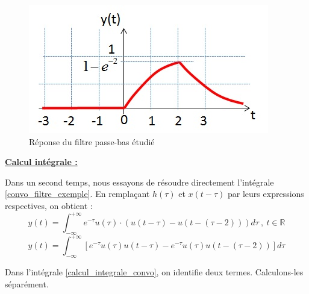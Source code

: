 	\begin{figure}[h!]
		\centering
		\includegraphics[scale=0.5]{images/Ex_reponse_prod_conv.jpg}
		\caption{Réponse du filtre passe-bas étudié}	
		\label{Fig:Ex_reponse_convo} 
	\end{figure}

	\vspace{1\baselineskip}
	\textbf{\underline{Calcul intégrale :}}
	
	Dans un second temps, nous essayons de résoudre directement l'intégrale \ref{convo_filtre_exemple}. En remplaçant $h(\tau)$ et $x(t-\tau)$ par leurs expressions respectives, on obtient :
	\begin{equation*}
	y(t)=\int_{-\infty}^{+\infty}e^{-\tau}u(\tau)\cdot(u(t-\tau)-u(t-(\tau-2)))d\tau~,~t\in \mathbb{R}
	\end{equation*}
	\begin{equation}\label{calcul_integrale_convo}
	y(t)=\int_{-\infty}^{+\infty}[e^{-\tau}u(\tau)u(t-\tau)-e^{-\tau}u(\tau)u(t-(\tau-2))]d\tau
	\end{equation}
	
	Dans l'intégrale \ref{calcul_integrale_convo}, on identifie deux termes. Calculons-les séparément.
	
